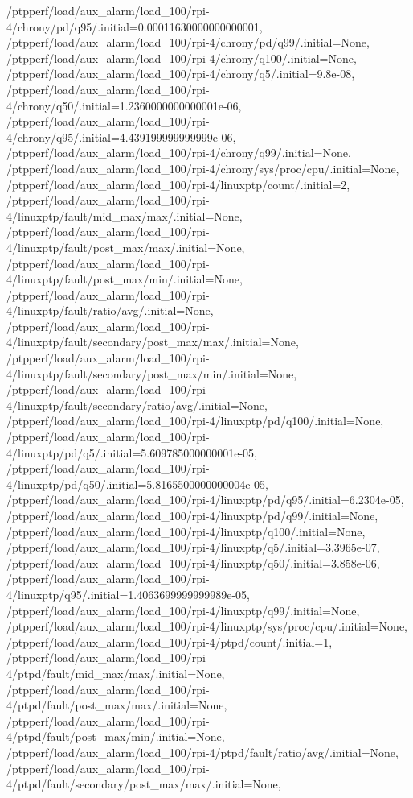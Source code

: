 {    /ptpperf/load/aux_alarm/load_100/rpi-4/chrony/pd/q95/.initial=0.00011630000000000001,
    /ptpperf/load/aux_alarm/load_100/rpi-4/chrony/pd/q99/.initial=None,
    /ptpperf/load/aux_alarm/load_100/rpi-4/chrony/q100/.initial=None,
    /ptpperf/load/aux_alarm/load_100/rpi-4/chrony/q5/.initial=9.8e-08,
    /ptpperf/load/aux_alarm/load_100/rpi-4/chrony/q50/.initial=1.2360000000000001e-06,
    /ptpperf/load/aux_alarm/load_100/rpi-4/chrony/q95/.initial=4.439199999999999e-06,
    /ptpperf/load/aux_alarm/load_100/rpi-4/chrony/q99/.initial=None,
    /ptpperf/load/aux_alarm/load_100/rpi-4/chrony/sys/proc/cpu/.initial=None,
    /ptpperf/load/aux_alarm/load_100/rpi-4/linuxptp/count/.initial=2,
    /ptpperf/load/aux_alarm/load_100/rpi-4/linuxptp/fault/mid_max/max/.initial=None,
    /ptpperf/load/aux_alarm/load_100/rpi-4/linuxptp/fault/post_max/max/.initial=None,
    /ptpperf/load/aux_alarm/load_100/rpi-4/linuxptp/fault/post_max/min/.initial=None,
    /ptpperf/load/aux_alarm/load_100/rpi-4/linuxptp/fault/ratio/avg/.initial=None,
    /ptpperf/load/aux_alarm/load_100/rpi-4/linuxptp/fault/secondary/post_max/max/.initial=None,
    /ptpperf/load/aux_alarm/load_100/rpi-4/linuxptp/fault/secondary/post_max/min/.initial=None,
    /ptpperf/load/aux_alarm/load_100/rpi-4/linuxptp/fault/secondary/ratio/avg/.initial=None,
    /ptpperf/load/aux_alarm/load_100/rpi-4/linuxptp/pd/q100/.initial=None,
    /ptpperf/load/aux_alarm/load_100/rpi-4/linuxptp/pd/q5/.initial=5.609785000000001e-05,
    /ptpperf/load/aux_alarm/load_100/rpi-4/linuxptp/pd/q50/.initial=5.8165500000000004e-05,
    /ptpperf/load/aux_alarm/load_100/rpi-4/linuxptp/pd/q95/.initial=6.2304e-05,
    /ptpperf/load/aux_alarm/load_100/rpi-4/linuxptp/pd/q99/.initial=None,
    /ptpperf/load/aux_alarm/load_100/rpi-4/linuxptp/q100/.initial=None,
    /ptpperf/load/aux_alarm/load_100/rpi-4/linuxptp/q5/.initial=3.3965e-07,
    /ptpperf/load/aux_alarm/load_100/rpi-4/linuxptp/q50/.initial=3.858e-06,
    /ptpperf/load/aux_alarm/load_100/rpi-4/linuxptp/q95/.initial=1.4063699999999989e-05,
    /ptpperf/load/aux_alarm/load_100/rpi-4/linuxptp/q99/.initial=None,
    /ptpperf/load/aux_alarm/load_100/rpi-4/linuxptp/sys/proc/cpu/.initial=None,
    /ptpperf/load/aux_alarm/load_100/rpi-4/ptpd/count/.initial=1,
    /ptpperf/load/aux_alarm/load_100/rpi-4/ptpd/fault/mid_max/max/.initial=None,
    /ptpperf/load/aux_alarm/load_100/rpi-4/ptpd/fault/post_max/max/.initial=None,
    /ptpperf/load/aux_alarm/load_100/rpi-4/ptpd/fault/post_max/min/.initial=None,
    /ptpperf/load/aux_alarm/load_100/rpi-4/ptpd/fault/ratio/avg/.initial=None,
    /ptpperf/load/aux_alarm/load_100/rpi-4/ptpd/fault/secondary/post_max/max/.initial=None,
}
